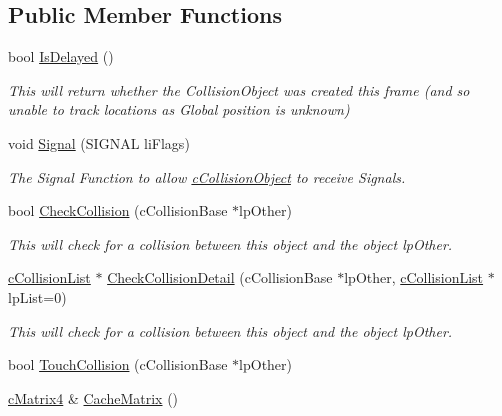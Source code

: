 \subsection*{Public Member Functions}
\begin{DoxyCompactItemize}
\item 
\hypertarget{classc_collision_object_a5e2c3c60b9001189d314cc76e18a581d}{
bool \hyperlink{classc_collision_object_a5e2c3c60b9001189d314cc76e18a581d}{IsDelayed} ()}
\label{classc_collision_object_a5e2c3c60b9001189d314cc76e18a581d}

\begin{DoxyCompactList}\small\item\em This will return whether the CollisionObject was created this frame (and so unable to track locations as Global position is unknown) \end{DoxyCompactList}\item 
\hypertarget{classc_collision_object_abec1a68ab54f2e80244c8b336bca3626}{
void \hyperlink{classc_collision_object_abec1a68ab54f2e80244c8b336bca3626}{Signal} (SIGNAL liFlags)}
\label{classc_collision_object_abec1a68ab54f2e80244c8b336bca3626}

\begin{DoxyCompactList}\small\item\em The Signal Function to allow \hyperlink{classc_collision_object}{cCollisionObject} to receive Signals. \end{DoxyCompactList}\item 
bool \hyperlink{classc_collision_object_a054c6522eef2c32087dd66a1a4659a1b}{CheckCollision} (cCollisionBase $\ast$lpOther)
\begin{DoxyCompactList}\small\item\em This will check for a collision between this object and the object lpOther. \end{DoxyCompactList}\item 
\hyperlink{classc_collision_list}{cCollisionList} $\ast$ \hyperlink{classc_collision_object_afcab60963a0b2ca63b4f10b2c2055110}{CheckCollisionDetail} (cCollisionBase $\ast$lpOther, \hyperlink{classc_collision_list}{cCollisionList} $\ast$lpList=0)
\begin{DoxyCompactList}\small\item\em This will check for a collision between this object and the object lpOther. \end{DoxyCompactList}\item 
bool \hyperlink{classc_collision_object_a013d8510d8045b48666a53ba51dd2841}{TouchCollision} (cCollisionBase $\ast$lpOther)
\item 
\hypertarget{classc_collision_object_abc47ab584910cc877b5e723be4e09eac}{
\hyperlink{classc_matrix4}{cMatrix4} \& \hyperlink{classc_collision_object_abc47ab584910cc877b5e723be4e09eac}{CacheMatrix} ()}
\label{classc_collision_object_abc47ab584910cc877b5e723be4e09eac}


\end{DoxyCompactItemize}
